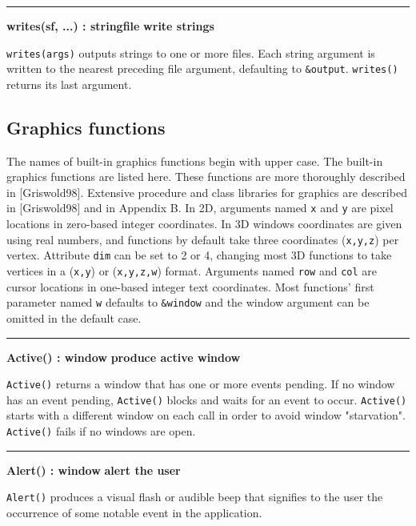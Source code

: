 \bigskip\hrule\vspace{0.1cm}
\noindent
{\bf writes(s{\textbar}f, ...) : string{\textbar}file } \hfill {\bf write strings}

\noindent
\texttt{writes(args)} outputs strings to one or more files. Each string
argument is written to the nearest preceding file argument, defaulting
to \texttt{\&output}. \texttt{writes()} returns its
last argument.

\subsection*{Graphics functions}

The names of built-in graphics functions begin with upper case. The built-in
graphics functions are listed here. These functions are more thoroughly
described in [Griswold98]. Extensive procedure and class libraries for graphics
are described in [Griswold98] and in Appendix B.  In 2D, arguments named
\texttt{x} and \texttt{y} are pixel locations in zero-based integer
coordinates. In 3D windows coordinates are given using real numbers, and
functions by default take three coordinates (\texttt{x,y,z}) per
vertex. Attribute \texttt{dim} can be set to 2 or 4, changing most 3D functions
to take vertices in a (\texttt{x,y}) or (\texttt{x,y,z,w}) format. Arguments
named \texttt{row} and \texttt{col} are cursor locations in one-based integer
text coordinates. Most functions' first parameter named
\texttt{w} defaults to \texttt{\&window} and the window argument can be omitted
in the default case. 

\bigskip\hrule\vspace{0.1cm}
\noindent
{\bf Active() : window } \hfill {\bf produce active window}

\noindent
\texttt{Active()} returns a window that has one or more events pending.
If no window has an event pending, \texttt{Active()} blocks and waits
for an event to occur. \texttt{Active()} starts with a different
window on each call in order to avoid window
"starvation". \texttt{Active()} fails if
no windows are open.

\bigskip\hrule\vspace{0.1cm}
\noindent
{\bf Alert() : window } \hfill {\bf alert the user}

\noindent
\texttt{Alert()} produces a visual flash or audible beep that signifies
to the user the occurrence of some notable event in the application.

